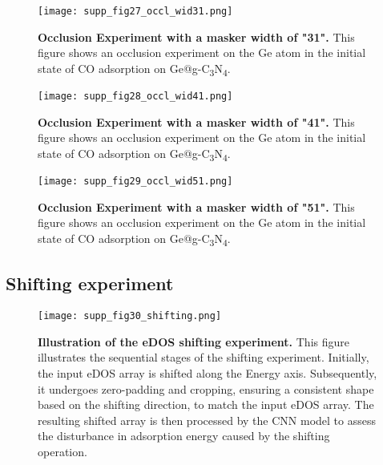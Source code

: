 \begin{figure}[htbp]
  \centering
  \texttt{[image: supp\_fig27\_occl\_wid31.png]}
  \caption{\textbf{Occlusion Experiment with a masker width of "31".}
  This figure shows an occlusion experiment on the Ge atom in
  the initial state of CO adsorption on Ge@g-C\textsubscript{3}N\textsubscript{4}.}
  \label{supp_fig27:occl_wid31}
\end{figure}

\begin{figure}[htbp]
  \centering
  \texttt{[image: supp\_fig28\_occl\_wid41.png]}
  \caption{\textbf{Occlusion Experiment with a masker width of "41".}
  This figure shows an occlusion experiment on the Ge atom in
  the initial state of CO adsorption on Ge@g-C\textsubscript{3}N\textsubscript{4}.}
  \label{supp_fig28:occl_wid41}
\end{figure}

\begin{figure}[htbp]
  \centering
  \texttt{[image: supp\_fig29\_occl\_wid51.png]}
  \caption{\textbf{Occlusion Experiment with a masker width of "51".}
  This figure shows an occlusion experiment on the Ge atom in
  the initial state of CO adsorption on Ge@g-C\textsubscript{3}N\textsubscript{4}.}
  \label{supp_fig29:occl_wid51}
\end{figure}

\subsection{Shifting experiment}
\label{supp_sec3.6_shifting}

\begin{figure}[htbp]
  \centering
  \texttt{[image: supp\_fig30\_shifting.png]}
  \caption{\textbf{Illustration of the eDOS shifting experiment.}
  This figure illustrates the sequential stages of the shifting experiment.
  Initially, the input eDOS array is shifted along the Energy axis.
  Subsequently, it undergoes zero-padding and cropping,
  ensuring a consistent shape based on the shifting direction, to match the input eDOS array.
  The resulting shifted array is then processed by the CNN model to
  assess the disturbance in adsorption energy caused by the shifting operation.}
  \label{supp_fig30:shifting}
\end{figure}

